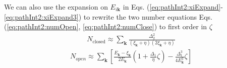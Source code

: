 \documentclass[reprint,pra]{revtex4-1}
\newcommand{\vk}{\ensuremath{\mathbf{k}}}
\newcommand{\nth}[1]{\ensuremath{\frac{1}{#1}}}
\newcommand{\mbr}[1]{\ensuremath{\left[#1\right]}}
\begin{document}
We can also use the expansion on $E_{i\vk}$ in Eqs. (\ref{eq:pathInt2:xiExpand}-\ref{eq:pathInt2:xiExpand3}) to rewrite the two number equations Eqs. (\ref{eq:pathInt2:numOpen}, \ref{eq:pathInt2:numClose}) to  first order in $\zeta$ 
\begin{gather}\label{eq:pathInt2:closeD2}
N_{\text{closed}}\approx\sum_{\vk}\frac{\Delta_{2}^2}{(\xi_{\vk}+\eta)(2\xi_{\vk}+\eta)}
\end{gather}
\begin{equation}
\begin{split}
N_{open}\approx\sum_\vk\mbr{\frac{E_\vk-\xi_\vk}{2E_\vk}(1+\frac{\Delta_{1}}{\eta}\zeta)-\frac{\Delta_{1}^{3}}{4E_\vk^{3}}\zeta
	}	
\end{split}
\end{equation}



%
%
%
%  
%  
%  
%  
%
\end{document}
